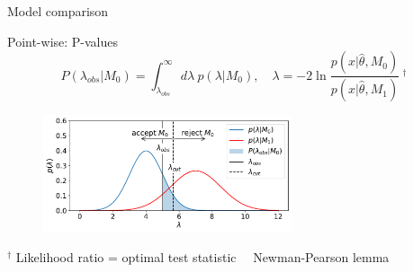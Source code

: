 \documentclass[
aspectratio=169,
14pt,
professionalfonts
]{beamer}
\newcommand{\arrow}{~\ding{220}~}
\begin{document}
\begin{frame}
    \center
    \Large
    Model comparison
\end{frame}

\begin{frame}{Point-wise: P-values}
    \vspace{-1cm}
    $$
    P(\lambda_{obs}|M_0) = \int_{\lambda_{obs}}^\infty d\lambda ~ p(\lambda|M_0), \quad  \lambda = -2 \ln \frac{p(x|\hat \theta, M_0)}{p(x|\hat \theta, M_1)} ~^\dagger
    $$
    \begin{figure}
        \centering
        \includegraphics[width=0.65\textwidth]{../plots/hypo.pdf}
    \end{figure}
    \small
    $^\dagger$ Likelihood ratio = optimal test statistic \arrow Newman-Pearson lemma
\end{frame}
\end{document}
